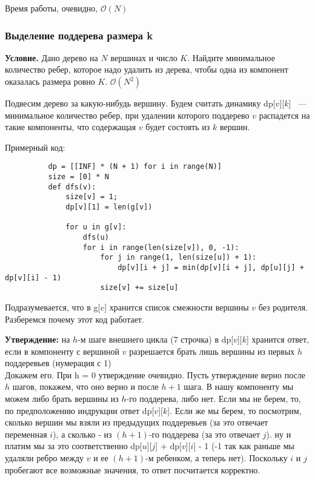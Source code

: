 \documentclass[a4paper,12pt]{article}
\begin{document}
      Время работы, очевидно, $\mathcal{O}(N)$

     
      \subsubsection{Выделение поддерева размера k}
      
      \textbf{Условие.} Дано дерево на $N$ вершинах и число $K$. 
      Найдите минимальное количество ребер, которое надо удалить из дерева, 
      чтобы одна из компонент оказалась размера ровно $K$. $\mathcal{O}(N^2)$
      
      Подвесим дерево за какую-нибудь вершину. Будем считать динамику 
      dp[$v$][$k$] ~--- минимальное количество ребер, при удалении которого
      поддерево $v$ распадется на такие компоненты, что содержащая $v$
      будет состоять из $k$ вершин.
      
      Примерный код:
      \begin{lstlisting}
          dp = [[INF] * (N + 1) for i in range(N)]
          size = [0] * N
          def dfs(v):
              size[v] = 1;
              dp[v][1] = len(g[v])
    
              for u in g[v]:
                  dfs(u)
                  for i in range(len(size[v]), 0, -1):
                      for j in range(1, len(size[u]) + 1):
                          dp[v][i + j] = min(dp[v][i + j], dp[u][j] + dp[v][i] - 1) 
                      size[v] += size[u]       
      \end{lstlisting}
      
      Подразумевается, что в g[$v$] хранится список смежности вершины
      $v$ без родителя.\\

      Разберемся почему этот код работает.

      \textbf{Утверждение:} на $h$-м шаге внешнего цикла (7 строчка) 
      в dp[$v$][$k$] хранится ответ, если в компоненту с вершиной $v$
      разрешается брать лишь вершины из первых $h$ поддеревьев (нумерация с 1)
      \\
      
      Докажем его. При h = 0 утверждение очевидно. Пусть утверждение верно 
      после $h$ шагов, покажем, что оно верно и после $h + 1$ шага. В нашу 
      компоненту мы можем либо брать вершины из $h$-го поддерева, либо нет. 
      Если мы не берем, то, по предположению индрукции ответ dp[$v$][$k$]. 
      Если же мы берем, то посмотрим, сколько вершин мы взяли из предыдущих 
      поддеревьев (за это отвечает переменная $i$), а сколько - из 
      $(h + 1)$-го поддерева (за это отвечает $j$). ну и платим мы за это 
      соответственно dp[$u$][$j$] + dp[$v$][$i$] - 1 (-1 так как раньше мы 
      удаляли ребро между $v$ и ее $(h + 1)$-м ребенком, а теперь нет). 
      Поскольку $i$ и $j$ пробегают все возможные значения, то ответ 
      посчитается корректно. 
      \\
      
\end{document}
